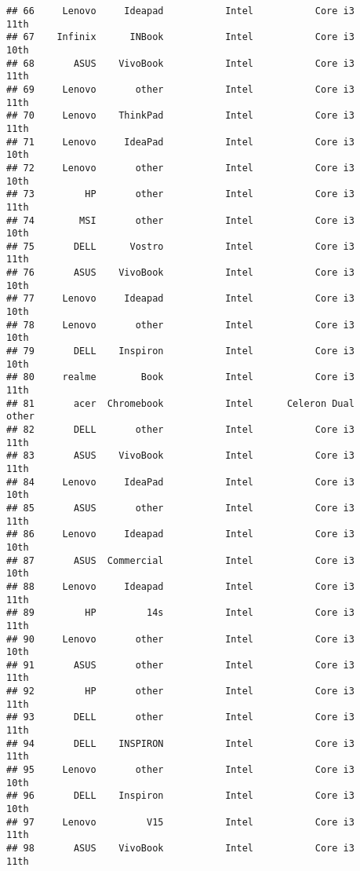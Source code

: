 \documentclass[
]{article}
\begin{document}
\begin{verbatim}
## 66     Lenovo     Ideapad           Intel           Core i3            11th
## 67    Infinix      INBook           Intel           Core i3            10th
## 68       ASUS    VivoBook           Intel           Core i3            11th
## 69     Lenovo       other           Intel           Core i3            11th
## 70     Lenovo    ThinkPad           Intel           Core i3            11th
## 71     Lenovo     IdeaPad           Intel           Core i3            10th
## 72     Lenovo       other           Intel           Core i3            10th
## 73         HP       other           Intel           Core i3            11th
## 74        MSI       other           Intel           Core i3            10th
## 75       DELL      Vostro           Intel           Core i3            11th
## 76       ASUS    VivoBook           Intel           Core i3            10th
## 77     Lenovo     Ideapad           Intel           Core i3            10th
## 78     Lenovo       other           Intel           Core i3            10th
## 79       DELL    Inspiron           Intel           Core i3            10th
## 80     realme        Book           Intel           Core i3            11th
## 81       acer  Chromebook           Intel      Celeron Dual           other
## 82       DELL       other           Intel           Core i3            11th
## 83       ASUS    VivoBook           Intel           Core i3            11th
## 84     Lenovo     IdeaPad           Intel           Core i3            10th
## 85       ASUS       other           Intel           Core i3            11th
## 86     Lenovo     Ideapad           Intel           Core i3            10th
## 87       ASUS  Commercial           Intel           Core i3            10th
## 88     Lenovo     Ideapad           Intel           Core i3            11th
## 89         HP         14s           Intel           Core i3            11th
## 90     Lenovo       other           Intel           Core i3            10th
## 91       ASUS       other           Intel           Core i3            11th
## 92         HP       other           Intel           Core i3            11th
## 93       DELL       other           Intel           Core i3            11th
## 94       DELL    INSPIRON           Intel           Core i3            11th
## 95     Lenovo       other           Intel           Core i3            10th
## 96       DELL    Inspiron           Intel           Core i3            10th
## 97     Lenovo         V15           Intel           Core i3            11th
## 98       ASUS    VivoBook           Intel           Core i3            11th

\end{verbatim}
\end{document}
